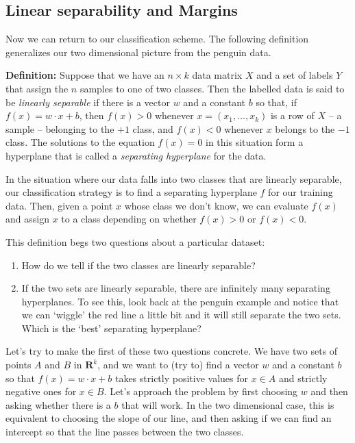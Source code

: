 \documentclass[
  oneside]{scrbook}
\providecommand{\tightlist}{%
  \setlength{\itemsep}{0pt}\setlength{\parskip}{0pt}}
\begin{document}
\hypertarget{sec:linearseparable}{%
\subsection{Linear separability and Margins}\label{sec:linearseparable}}

Now we can return to our classification scheme. The following definition
generalizes our two dimensional picture from the penguin data.

\textbf{Definition:} Suppose that we have an \(n\times k\) data matrix
\(X\) and a set of labels \(Y\) that assign the \(n\) samples to one of
two classes. Then the labelled data is said to be \emph{linearly
separable} if there is a vector \(w\) and a constant \(b\) so that, if
\(f(x)=w\cdot x+b\), then \(f(x)>0\) whenever \(x=(x_1,\ldots, x_k)\) is
a row of \(X\) -- a sample -- belonging to the \(+1\) class, and
\(f(x)<0\) whenever \(x\) belongs to the \(-1\) class. The solutions to
the equation \(f(x)=0\) in this situation form a hyperplane that is
called a \emph{separating hyperplane} for the data.

In the situation where our data falls into two classes that are linearly
separable, our classification strategy is to find a separating
hyperplane \(f\) for our training data. Then, given a point \(x\) whose
class we don't know, we can evaluate \(f(x)\) and assign \(x\) to a
class depending on whether \(f(x)>0\) or \(f(x)<0\).

This definition begs two questions about a particular dataset:

\begin{enumerate}
\def\labelenumi{\arabic{enumi}.}
\tightlist
\item
  How do we tell if the two classes are linearly separable?
\item
  If the two sets are linearly separable, there are infinitely many
  separating hyperplanes. To see this, look back at the penguin example
  and notice that we can `wiggle' the red line a little bit and it will
  still separate the two sets. Which is the `best' separating
  hyperplane?
\end{enumerate}

Let's try to make the first of these two questions concrete. We have two
sets of points \(A\) and \(B\) in \(\mathbf{R}^{k}\), and we want to
(try to) find a vector \(w\) and a constant \(b\) so that
\(f(x)=w\cdot x+b\) takes strictly positive values for \(x\in A\) and
strictly negative ones for \(x\in B\). Let's approach the problem by
first choosing \(w\) and then asking whether there is a \(b\) that will
work. In the two dimensional case, this is equivalent to choosing the
slope of our line, and then asking if we can find an intercept so that
the line passes between the two classes.
\end{document}

